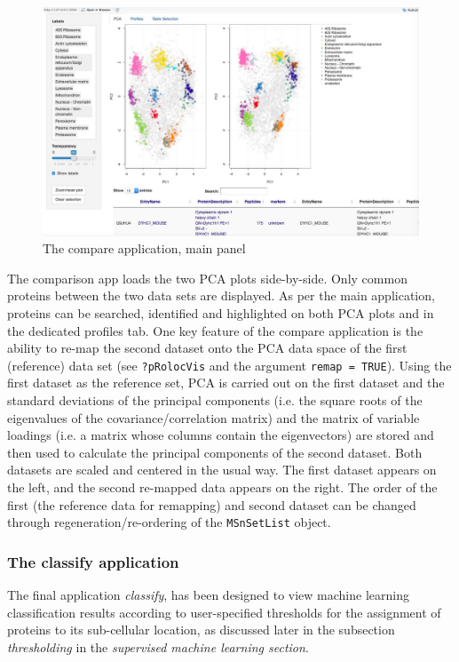 \begin{figure}[!ht]
  \centering
  \includegraphics[width=\textwidth]{./Figures/SS_Compare1.jpg}
  \caption{The compare application, main panel}
  \label{fig:compare}
\end{figure}

The comparison app loads the two PCA plots side-by-side. Only common
proteins between the two data sets are displayed. As per the main
application, proteins can be searched, identified and highlighted on
both PCA plots and in the dedicated profiles tab. One key feature of
the compare application is the ability to re-map the second dataset
onto the PCA data space of the first (reference) data set (see
\texttt{?pRolocVis} and the argument \texttt{remap = TRUE}). Using the first dataset
as the reference set, PCA is carried out on the first dataset and the
standard deviations of the principal components (i.e. the square roots
of the eigenvalues of the covariance/correlation matrix) and the
matrix of variable loadings (i.e. a matrix whose columns contain the
eigenvectors) are stored and then used to calculate the principal
components of the second dataset. Both datasets are scaled and
centered in the usual way. The first dataset appears on the left, and
the second re-mapped data appears on the right. The order of the first
(the reference data for remapping) and second dataset can be changed
through regeneration/re-ordering of the \texttt{MSnSetList} object.

\subsubsection*{The classify application}
The final application \textit{classify}, has been designed to view
machine learning classification results according to user-specified
thresholds for the assignment of proteins to its sub-cellular
location, as discussed later in the subsection \textit{thresholding}
in the \textit{supervised machine learning section}.


